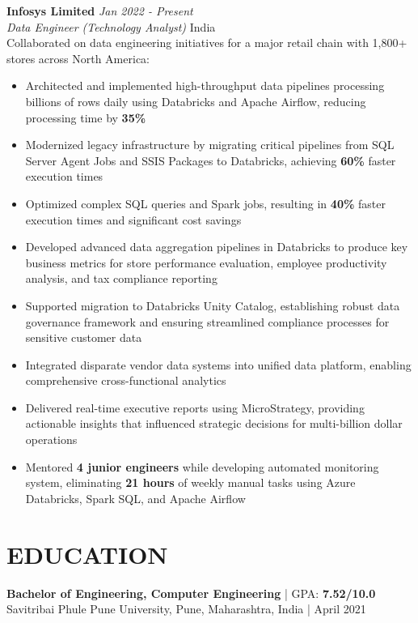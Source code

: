 \documentclass[10pt,letterpaper]{article}
\newcommand{\jobentry}[4]{
    \noindent\textbf{#1} \hfill \textit{#2} \\
    \textit{#3} \hfill #4 \\[4pt]
}
\newcommand{\metric}[1]{\textbf{\color{accent}#1}}
\begin{document}
\jobentry{Infosys Limited}{Jan 2022 - Present}{Data Engineer (Technology Analyst)}{India}
\noindent Collaborated on data engineering initiatives for a major retail chain with 1,800+ stores across North America:

\begin{itemize}[leftmargin=*,nosep,itemsep=3pt,topsep=4pt]
    \item Architected and implemented high-throughput data pipelines processing billions of rows daily using Databricks and Apache Airflow, reducing processing time by \metric{35\%}

    \item Modernized legacy infrastructure by migrating critical pipelines from SQL Server Agent Jobs and SSIS Packages to Databricks, achieving \metric{60\%} faster execution times

    \item Optimized complex SQL queries and Spark jobs, resulting in \metric{40\%} faster execution times and significant cost savings

    \item Developed advanced data aggregation pipelines in Databricks to produce key business metrics for store performance evaluation, employee productivity analysis, and tax compliance reporting

    \item Supported migration to Databricks Unity Catalog, establishing robust data governance framework and ensuring streamlined compliance processes for sensitive customer data

    \item Integrated disparate vendor data systems into unified data platform, enabling comprehensive cross-functional analytics

    \item Delivered real-time executive reports using MicroStrategy, providing actionable insights that influenced strategic decisions for multi-billion dollar operations

    \item Mentored \textbf{4 junior engineers} while developing automated monitoring system, eliminating \metric{21 hours} of weekly manual tasks using Azure Databricks, Spark SQL, and Apache Airflow
\end{itemize}

\section{EDUCATION}
\noindent\textbf{Bachelor of Engineering, Computer Engineering} | GPA: \textbf{7.52/10.0} \\
Savitribai Phule Pune University, Pune, Maharashtra, India | April 2021
\end{document}
